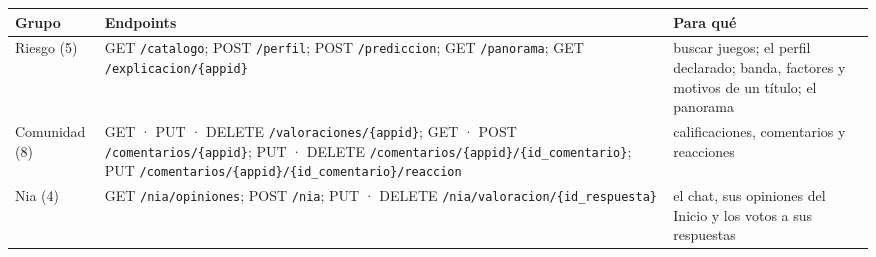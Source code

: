 \begin{tabularx}{\textwidth}{>{\raggedright\arraybackslash}p{2.2cm} >{\raggedright\arraybackslash\footnotesize}X >{\raggedright\arraybackslash}p{3.7cm}}
\toprule
Grupo & Endpoints & Para qué \\
\midrule
Riesgo (5) & GET \texttt{/catalogo}; POST \texttt{/perfil}; POST \texttt{/prediccion}; GET \texttt{/panorama}; GET \texttt{/explicacion/\{appid\}} & buscar juegos; el perfil declarado; banda, factores y motivos de un título; el panorama \\
Comunidad (8) & GET · PUT · DELETE \texttt{/valoraciones/\{appid\}}; GET · POST \texttt{/comentarios/\{appid\}}; PUT · DELETE \texttt{/comentarios/\{appid\}/\{id\_comentario\}}; PUT \texttt{/comentarios/\{appid\}/\{id\_comentario\}/reaccion} & calificaciones, comentarios y reacciones \\
Nia (4) & GET \texttt{/nia/opiniones}; POST \texttt{/nia}; PUT · DELETE \texttt{/nia/valoracion/\{id\_respuesta\}} & el chat, sus opiniones del Inicio y los votos a sus respuestas \\
\bottomrule
\end{tabularx}
